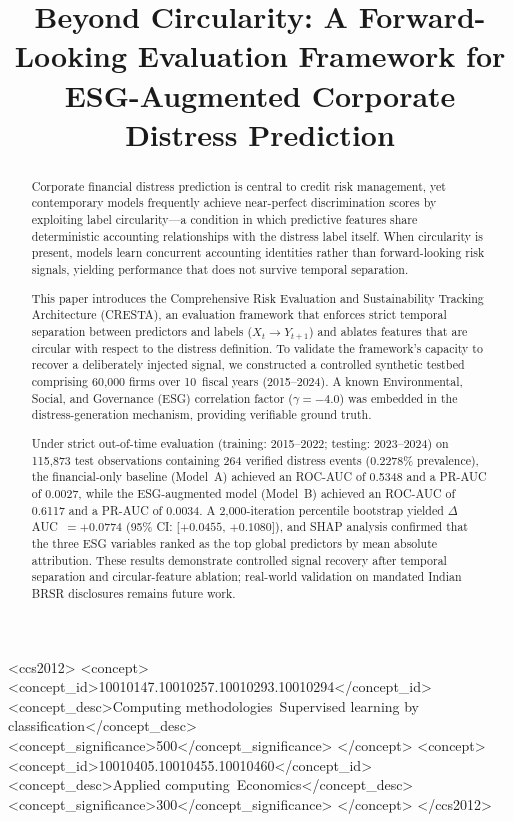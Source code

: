 \documentclass[sigconf,anonymous]{acmart}
\begin{document}
\title{Beyond Circularity: A Forward-Looking Evaluation Framework for ESG-Augmented Corporate Distress Prediction}

\begin{abstract}
Corporate financial distress prediction is central to credit risk management, yet contemporary models frequently achieve near-perfect discrimination scores by exploiting label circularity---a condition in which predictive features share deterministic accounting relationships with the distress label itself. When circularity is present, models learn concurrent accounting identities rather than forward-looking risk signals, yielding performance that does not survive temporal separation.

This paper introduces the Comprehensive Risk Evaluation and Sustainability Tracking Architecture (CRESTA), an evaluation framework that enforces strict temporal separation between predictors and labels ($X_t \to Y_{t+1}$) and ablates features that are circular with respect to the distress definition. To validate the framework's capacity to recover a deliberately injected signal, we constructed a controlled synthetic testbed comprising 60,000 firms over 10~fiscal years (2015--2024). A known Environmental, Social, and Governance (ESG) correlation factor ($\gamma = -4.0$) was embedded in the distress-generation mechanism, providing verifiable ground truth.

Under strict out-of-time evaluation (training: 2015--2022; testing: 2023--2024) on 115,873 test observations containing 264 verified distress events (0.2278\% prevalence), the financial-only baseline (Model~A) achieved an ROC-AUC of 0.5348 and a PR-AUC of 0.0027, while the ESG-augmented model (Model~B) achieved an ROC-AUC of 0.6117 and a PR-AUC of 0.0034. A 2,000-iteration percentile bootstrap yielded $\Delta$AUC~$= +0.0774$ (95\% CI: [$+0.0455$, $+0.1080$]), and SHAP analysis confirmed that the three ESG variables ranked as the top global predictors by mean absolute attribution. These results demonstrate controlled signal recovery after temporal separation and circular-feature ablation; real-world validation on mandated Indian BRSR disclosures remains future work.
\end{abstract}

\begin{CCSXML}
<ccs2012>
   <concept>
       <concept_id>10010147.10010257.10010293.10010294</concept_id>
       <concept_desc>Computing methodologies~Supervised learning by classification</concept_desc>
       <concept_significance>500</concept_significance>
       </concept>
   <concept>
       <concept_id>10010405.10010455.10010460</concept_id>
       <concept_desc>Applied computing~Economics</concept_desc>
       <concept_significance>300</concept_significance>
       </concept>
 </ccs2012>
\end{CCSXML}
\end{document}
